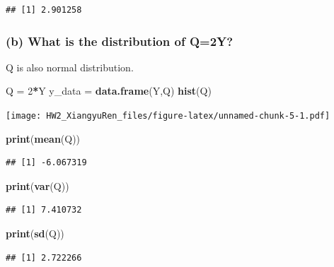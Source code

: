 \documentclass[
]{article}
\newenvironment{Shaded}{\begin{snugshade}}{\end{snugshade}}
\newcommand{\DecValTok}[1]{\textcolor[rgb]{0.00,0.00,0.81}{#1}}
\newcommand{\KeywordTok}[1]{\textcolor[rgb]{0.13,0.29,0.53}{\textbf{#1}}}
\newcommand{\NormalTok}[1]{#1}
\newcommand{\OperatorTok}[1]{\textcolor[rgb]{0.81,0.36,0.00}{\textbf{#1}}}
\newcommand{\StringTok}[1]{\textcolor[rgb]{0.31,0.60,0.02}{#1}}
\begin{document}
\begin{verbatim}
## [1] 2.901258
\end{verbatim}

\hypertarget{b-what-is-the-distribution-of-q2y}{%
\subsubsection{(b) What is the distribution of
Q=2Y?}\label{b-what-is-the-distribution-of-q2y}}

Q is also normal distribution.

\begin{Shaded}
\begin{Highlighting}[]
\NormalTok{Q =}\StringTok{ }\DecValTok{2}\OperatorTok{*}\NormalTok{Y}
\NormalTok{y_data =}\StringTok{ }\KeywordTok{data.frame}\NormalTok{(Y,Q)}
\KeywordTok{hist}\NormalTok{(Q)}
\end{Highlighting}
\end{Shaded}

\texttt{[image: HW2\_XiangyuRen\_files/figure-latex/unnamed-chunk-5-1.pdf]}

\begin{Shaded}
\begin{Highlighting}[]
\KeywordTok{print}\NormalTok{(}\KeywordTok{mean}\NormalTok{(Q))}
\end{Highlighting}
\end{Shaded}

\begin{verbatim}
## [1] -6.067319
\end{verbatim}

\begin{Shaded}
\begin{Highlighting}[]
\KeywordTok{print}\NormalTok{(}\KeywordTok{var}\NormalTok{(Q))}
\end{Highlighting}
\end{Shaded}

\begin{verbatim}
## [1] 7.410732
\end{verbatim}

\begin{Shaded}
\begin{Highlighting}[]
\KeywordTok{print}\NormalTok{(}\KeywordTok{sd}\NormalTok{(Q))}
\end{Highlighting}
\end{Shaded}

\begin{verbatim}
## [1] 2.722266
\end{verbatim}
\end{document}
